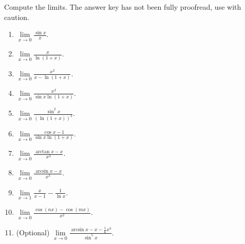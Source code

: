 Compute the limits. The answer key has not been fully proofread, use with caution.
\begin{multicols}{2}
\begin{enumerate}
\item $\displaystyle \lim\limits_{x\to 0} \frac{\sin x  }{x}$. 
\item $\displaystyle \lim\limits_{x\to 0} \frac{x}{\ln (1+x)}$. 
\item $\displaystyle \lim\limits_{x\to 0} \frac{x^2}{x-\ln (1+x)}$. 
\item $\displaystyle \lim\limits_{x\to 0} \frac{x^2}{\sin x\ln (1+x)}$. 
\item $\displaystyle \lim\limits_{x\to 0} \frac{\sin^2 x  }{\left(\ln (1+x)\right)^2}$.
\item $\displaystyle \lim\limits_{x\to 0} \frac{\cos x- 1}{\sin x\ln (1+x)}$.
\item $\displaystyle \lim\limits_{x\to 0} \frac{\arctan x -x}{x^3} $.
\item $\displaystyle \lim\limits_{x\to 0} \frac{\arcsin x -x}{x^3} $.
\item $\displaystyle \lim\limits_{x\to 1} \frac{x}{x-1}-\frac{1}{\ln x}$.
\item $\displaystyle \lim\limits_{x\to 0} \frac{\cos (nx) -\cos (mx)}{x^2 }$.
\item (Optional)  $\displaystyle \lim \limits_{x\to 0} \frac{\arcsin x-x-\frac{1}{6}x^3}{\sin^5 x} $. 
\end{enumerate}
\end{multicols}